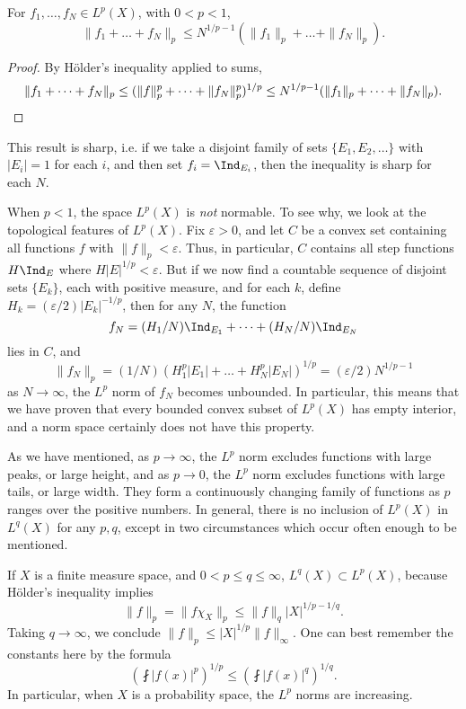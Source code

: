 \begin{theorem} \label{quasitriangleinequalitylp}
    For $f_1, \dots, f_N \in L^p(X)$, with $0 < p < 1$,
    \[ \| f_1 + \dots + f_N \|_p \leq N^{1/p - 1} (\| f_1 \|_p + \dots + \| f_N \|_p). \]
\end{theorem}
\begin{proof}
    By H\"{o}lder's inequality applied to sums,
    \[ \| f_1 + \dots + f_N \|_p \leq (\| f \|_p^p + \dots + \| f_N \|_p^p)^{1/p} \leq N^{1/p - 1} (\| f_1 \|_p + \dots + \| f_N \|_p). \qedhere \]
\end{proof}

This result is sharp, i.e. if we take a disjoint family of sets $\{ E_1, E_2, \dots \}$ with $|E_i| = 1$ for each $i$, and then set $f_i = \Ind_{E_i}$, then the inequality is sharp for each $N$.

\begin{remark}
    When $p < 1$, the space $L^p(X)$ is \emph{not} normable. To see why, we look at the topological features of $L^p(X)$. Fix $\varepsilon > 0$, and let $C$ be a convex set containing all functions $f$ with $\| f \|_p < \varepsilon$. Thus, in particular, $C$ contains all step functions $H \Ind_E$ where $H |E|^{1/p} < \varepsilon$. But if we now find a countable sequence of disjoint sets $\{ E_k \}$, each with positive measure, and for each $k$, define $H_k = (\varepsilon/2) |E_k|^{-1/p}$, then for any $N$, the function
    \[ f_N = (H_1/N) \Ind_{E_1} + \dots + (H_N/N) \Ind_{E_N} \]
    lies in $C$, and
    \[ \| f_N \|_p = (1/N) (H_1^p |E_1| + \dots + H_N^p |E_N|)^{1/p} = (\varepsilon/2) N^{1/p - 1} \]
    as $N \to \infty$, the $L^p$ norm of $f_N$ becomes unbounded. In particular, this means that we have proven that every bounded convex subset of $L^p(X)$ has empty interior, and a norm space certainly does not have this property.
\end{remark}

As we have mentioned, as $p \to \infty$, the $L^p$ norm excludes functions with large peaks, or large height, and as $p \to 0$, the $L^p$ norm excludes functions with large tails, or large width. They form a continuously changing family of functions as $p$ ranges over the positive numbers. In general, there is no inclusion of $L^p(X)$ in $L^q(X)$ for any $p,q$, except in two circumstances which occur often enough to be mentioned.

\begin{example}
  If $X$ is a finite measure space, and $0 < p \leq q \leq \infty$, $L^q(X) \subset L^p(X)$, because H\"{o}lder's inequality implies
  \[ \| f \|_p = \| f \chi_X \|_p \leq \| f \|_q |X|^{1/p-1/q}. \]
  Taking $q \to \infty$, we conclude $\| f \|_p \leq | X |^{1/p} \| f \|_\infty$. One can best remember the constants here by the formula
  \[ \left( \fint |f(x)|^p \right)^{1/p} \leq \left( \fint |f(x)|^q \right)^{1/q}. \]
  In particular, when $X$ is a probability space, the $L^p$ norms are increasing.
\end{example}

